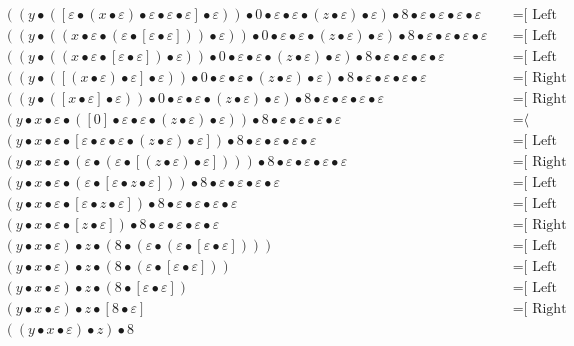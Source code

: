 \documentclass{article}
\begin{document}
\begin{align*}
((y • ([ε • (x • ε) • ε • ε • ε] • ε)) • 0 • ε • ε • (z • ε) • ε) • 8 • ε • ε • ε • ε
  & \quad \text{=[ Left neutrality ⟩}\\
((y • ((x • ε • (ε • [ε • ε])) • ε)) • 0 • ε • ε • (z • ε) • ε) • 8 • ε • ε • ε • ε
  & \quad \text{=[ Left neutrality ⟩}\\
((y • ((x • ε • [ε • ε]) • ε)) • 0 • ε • ε • (z • ε) • ε) • 8 • ε • ε • ε • ε
  & \quad \text{=[ Left neutrality ⟩}\\
((y • ([(x • ε) • ε] • ε)) • 0 • ε • ε • (z • ε) • ε) • 8 • ε • ε • ε • ε
  & \quad \text{=[ Right neutrality ⟩}\\
((y • ([x • ε] • ε)) • 0 • ε • ε • (z • ε) • ε) • 8 • ε • ε • ε • ε
  & \quad \text{=[ Right neutrality ⟩}\\
(y • x • ε • ([0] • ε • ε • (z • ε) • ε)) • 8 • ε • ε • ε • ε
  & \quad \text{=⟨ Evaluate ]}\\
(y • x • ε • [ε • ε • ε • (z • ε) • ε]) • 8 • ε • ε • ε • ε
  & \quad \text{=[ Left neutrality ⟩}\\
(y • x • ε • (ε • (ε • [(z • ε) • ε]))) • 8 • ε • ε • ε • ε
  & \quad \text{=[ Right neutrality ⟩}\\
(y • x • ε • (ε • [ε • z • ε])) • 8 • ε • ε • ε • ε
  & \quad \text{=[ Left neutrality ⟩}\\
(y • x • ε • [ε • z • ε]) • 8 • ε • ε • ε • ε
  & \quad \text{=[ Left neutrality ⟩}\\
(y • x • ε • [z • ε]) • 8 • ε • ε • ε • ε
  & \quad \text{=[ Right neutrality ⟩}\\
(y • x • ε) • z • (8 • (ε • (ε • [ε • ε])))
  & \quad \text{=[ Left neutrality ⟩}\\
(y • x • ε) • z • (8 • (ε • [ε • ε]))
  & \quad \text{=[ Left neutrality ⟩}\\
(y • x • ε) • z • (8 • [ε • ε])
  & \quad \text{=[ Left neutrality ⟩}\\
(y • x • ε) • z • [8 • ε]
  & \quad \text{=[ Right neutrality ⟩}\\
((y • x • ε) • z) • 8
\end{align*}
\end{document}
